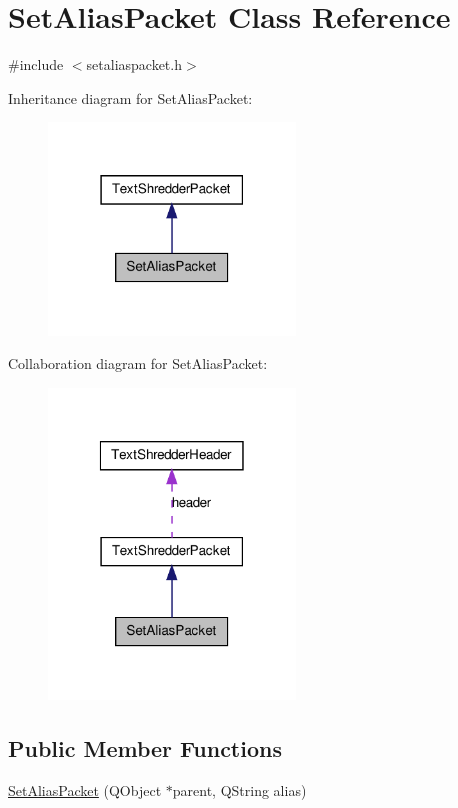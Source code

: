 \hypertarget{class_set_alias_packet}{
\section{SetAliasPacket Class Reference}
\label{class_set_alias_packet}
}


{\ttfamily \#include $<$setaliaspacket.h$>$}



Inheritance diagram for SetAliasPacket:\nopagebreak
\begin{figure}[H]
\begin{center}
\leavevmode
\includegraphics[width=186pt]{class_set_alias_packet__inherit__graph}
\end{center}
\end{figure}


Collaboration diagram for SetAliasPacket:\nopagebreak
\begin{figure}[H]
\begin{center}
\leavevmode
\includegraphics[width=186pt]{class_set_alias_packet__coll__graph}
\end{center}
\end{figure}
\subsection*{Public Member Functions}
\begin{DoxyCompactItemize}
\item 
\hyperlink{class_set_alias_packet_a021c20f181919078df141c279e1eb8b4}{SetAliasPacket} (QObject $\ast$parent, QString alias)
\end{DoxyCompactItemize}


